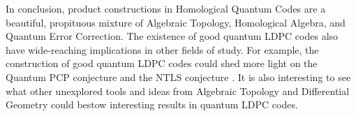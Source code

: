 \documentclass[12pt]{article}%
\theoremstyle{definition}
\begin{document}

        In conclusion, product constructions in Homological Quantum Codes are a beautiful, propituous mixture of Algebraic Topology, Homological Algebra, and Quantum Error Correction. The existence of good quantum LDPC codes also have wide-reaching implications in other fields of study. For example, the construction of good quantum LDPC codes could shed more light on the Quantum PCP conjecture and the NTLS conjecture \cite{aharonov2013guest, freedman2013quantum}. It is also interesting to see what other unexplored tools and ideas from Algebraic Topology and Differential Geometry could bestow interesting results in quantum LDPC codes.







\end{document}
